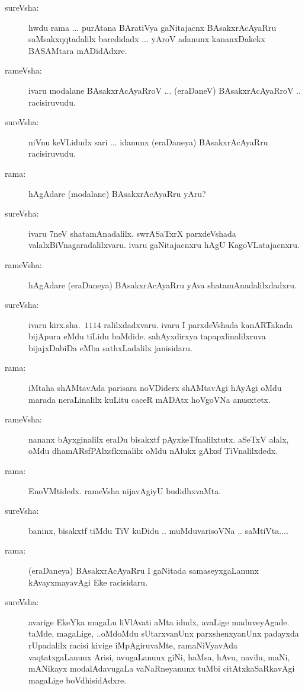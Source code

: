 \begin{description}
\item[sureVsha:] hwdu rama ... purAtana BAratiVya gaNitajacnx BAsakxrAcAyaRru saMsakxqqtadalilx baredidadx ... yAroV adanunx kananxDakekx BASAMtara mADidAdxre.

\item[rameVsha:] ivaru modalane BAsakxrAcAyaRroV ... (eraDaneV) BAsakxrAcAyaRroV .. racisiruvudu.

\item[sureVsha:] niVnu keVLidudx sari ... idanunx (eraDaneya) BAsakxrAcAyaRru racisiruvudu.

\item[rama:] hAgAdare (modalane) BAsakxrAcAyaRru yAru?

\item[sureVsha:] ivaru $7$neV shatamAnadalilx. swrASaTxrX parxdeVshada valalxBiVnagaradalilxvaru. ivaru gaNitajacnxru hAgU KagoVLatajacnxru.

\item[rameVsha:] hAgAdare (eraDaneya) BAsakxrAcAyaRru yAva shatamAnadalilxdadxru.

\item[sureVsha:] ivaru kirx.sha.\ $1114$ ralilxdadxvaru. ivaru I parxdeVshada kanARTakada bijApura eMdu tiLidu baMdide. sahAyxdirxya tapapxlinalilxruva bijajxDabiDa eMba sathxLadalilx janisidaru.

\item[rama:] iMtaha shAMtavAda parisara noVDiderx shAMtavAgi hAyAgi oMdu marada neraLinalilx kuLitu caceR mADAtx hoVgoVNa anusxtetx.

\item[rameVsha:] nananx bAyxginalilx eraDu bisakxtf pAyxkeTfnalilxtutx. aSeTxV alalx, oMdu dhamARsfPAlxsfkxnalilx oMdu nAlukx gAlxsf TiVnalilxdedx.

\item[rama:] EnoVMtidedx. rameVsha nijavAgiyU budidhxvaMta.

\item[sureVsha:] baninx, bisakxtf tiMdu TiV kuDidu .. muMduvarisoVNa .. saMtiVta....

\item[rama:] (eraDaneya) BAsakxrAcAyaRru I gaNitada samaseyxgaLanunx kAvayxmayavAgi Eke racisidaru.

\item[sureVsha:] avarige EkeYka magaLu liVlAvati aMta idudx, avaLige maduveyAgade. taMde, magaLige, ..oMdoMdu sUtarxvanUnx parxshenxyanUnx padayxda rUpadalilx racisi kivige iMpAgiruvaMte, ramaNiVyavAda vaqtatxgaLanunx Arisi, avugaLanunx giNi, haMsa, hAvu, navilu, maNi, mANikayx modalAdavugaLa vaNaRneyanunx tuMbi citAtxkaSaRkavAgi magaLige boVdhisidAdxre.


\end{description}
